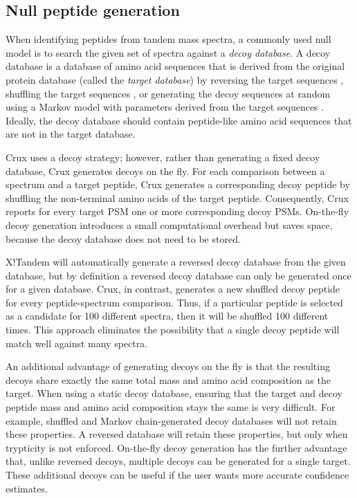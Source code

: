 \documentclass[12pt]{article}
\begin{document}
\subsection{Null peptide generation}
\label{section:on-the-fly}

When identifying peptides from tandem mass spectra, a commonly used
null model is to search the given set of spectra against a {\em decoy
database}.  A decoy database is a database of amino acid sequences
that is derived from the original protein database (called the {\em
target database}) by reversing the target sequences
\cite{moore:qscore}, shuffling the target sequences
\cite{klammer:effects}, or generating the decoy sequences at random
using a Markov model with parameters derived from the target sequences
\cite{colinge:olav}.  Ideally, the decoy database should contain
peptide-like amino acid sequences that are not in the target database.

Crux uses a decoy strategy; however, rather than generating a fixed
decoy database, Crux generates decoys on the fly.  For each comparison
between a spectrum and a target peptide, Crux generates a
corresponding decoy peptide by shuffling the non-terminal amino acids
of the target peptide.  Consequently, Crux reports for every target
PSM one or more corresponding decoy PSMs.  On-the-fly decoy generation
introduces a small computational overhead but saves space, because the
decoy database does not need to be stored.

X!Tandem \cite{craig:tandem} will automatically generate a reversed
decoy database from the given database, but by definition a reversed
decoy database can only be generated once for a given database.
Crux, in contrast, generates a new shuffled decoy peptide for every
peptide-spectrum comparison.  Thus, if a particular peptide is
selected as a candidate for 100 different spectra, then it will be
shuffled 100 different times.  This approach eliminates the
possibility that a single decoy peptide will match well against many
spectra.

An additional advantage of generating decoys on the fly is that the
resulting decoys share exactly the same total mass and amino acid
composition as the target.  When using a static decoy database,
ensuring that the target and decoy peptide mass and amino acid
composition stays the same is very difficult.  For example, shuffled
and Markov chain-generated decoy databases will not retain these
properties. A reversed database will retain these properties, but only
when trypticity is not enforced.  On-the-fly decoy generation has the
further advantage that, unlike reversed decoys, multiple decoys can be
generated for a single target.  These additional decoys can be useful
if the user wants more accurate confidence estimates.
\end{document}
